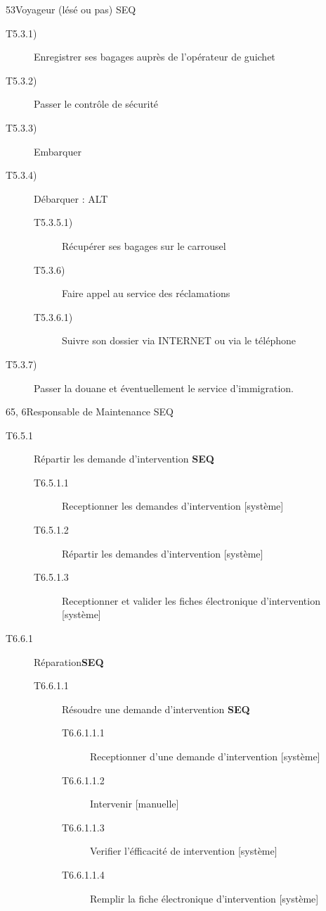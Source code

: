 \dta
{5}{3}{Voyageur (lésé ou pas)}
{SEQ}
{
\begin{description}
	\item [T5.3.1)] Enregistrer ses bagages auprès de l'opérateur de guichet
	\item [T5.3.2)] Passer le contrôle de sécurité
	\item [T5.3.3)] Embarquer
	\item [T5.3.4)] Débarquer : ALT
	\begin{description}
		\item [T5.3.5.1)] Récupérer ses bagages sur le carrousel
		\item [T5.3.6)] Faire appel au service des réclamations
		\item [T5.3.6.1)] Suivre son dossier via INTERNET ou via le téléphone
	\end{description}
	\item [T5.3.7)] Passer la douane et éventuellement le service d'immigration.
\end{description}
}

\dta
{6}{5, 6}{Responsable de Maintenance}
{SEQ}
{
\begin{description}
	\item[T6.5.1] Répartir les demande d'intervention \textbf{SEQ}
	\begin{description}
		\item[T6.5.1.1] Receptionner les demandes d'intervention [système]
		\item[T6.5.1.2] Répartir les demandes d'intervention [système]
		\item[T6.5.1.3] Receptionner et valider les fiches électronique d'intervention [système]
	\end{description}

	\item[T6.6.1] Réparation\textbf{SEQ}
	\begin{description}
		\item[T6.6.1.1] Résoudre une demande d'intervention \textbf{SEQ}
		\begin{description}
			\item[T6.6.1.1.1] Receptionner d'une demande d'intervention [système]
			\item[T6.6.1.1.2] Intervenir [manuelle]
			\item[T6.6.1.1.3] Verifier l'éfficacité de intervention [système]
			\item[T6.6.1.1.4] Remplir la fiche électronique d'intervention [système]
		\end{description}
	\end{description}
\end{description}
}

